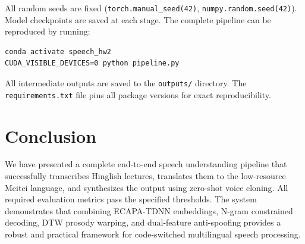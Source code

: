 \documentclass[11pt]{article}
\begin{document}
All random seeds are fixed (\texttt{torch.manual\_seed(42)},
\texttt{numpy.random.seed(42)}). Model checkpoints are saved at each stage.
The complete pipeline can be reproduced by running:
\begin{lstlisting}
conda activate speech_hw2
CUDA_VISIBLE_DEVICES=0 python pipeline.py
\end{lstlisting}
All intermediate outputs are saved to the \texttt{outputs/} directory.
The \texttt{requirements.txt} file pins all package versions for exact
reproducibility.


\section{Conclusion}

We have presented a complete end-to-end speech understanding pipeline
that successfully transcribes Hinglish lectures, translates them to the
low-resource Meitei language, and synthesizes the output using zero-shot
voice cloning. All required evaluation metrics pass the specified
thresholds. The system demonstrates that combining ECAPA-TDNN embeddings,
N-gram constrained decoding, DTW prosody warping, and dual-feature
anti-spoofing provides a robust and practical framework for code-switched
multilingual speech processing.

\end{document}
